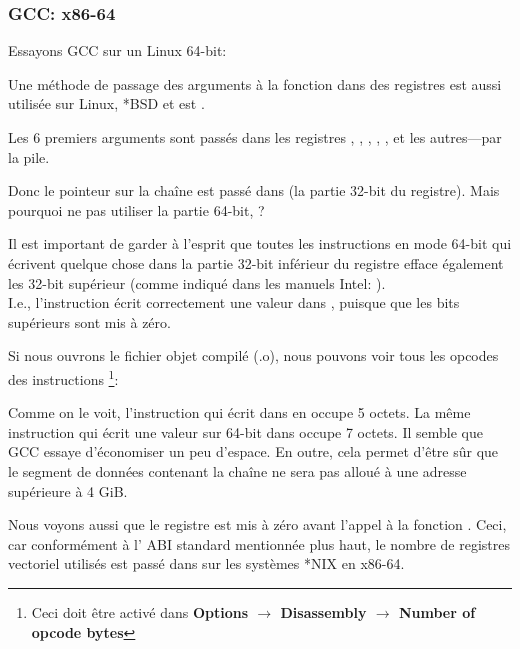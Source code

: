 \subsubsection{GCC: x86-64}

Essayons GCC sur un Linux 64-bit:



Une méthode de passage des arguments à la fonction dans des registres est aussi utilisée sur Linux, *BSD et
\MacOSX est \SysVABI.

Les 6 premiers arguments sont passés dans les registres \RDI, \RSI, \RDX, \RCX, ,  et les autres---par
la pile.

Donc le pointeur sur la chaîne est passé dans \EDI (la partie 32-bit du registre).
Mais pourquoi ne pas utiliser la partie 64-bit, \RDI?

Il est important de garder à l'esprit que toutes les instructions \MOV en mode 64-bit qui écrivent quelque chose
dans la partie 32-bit inférieur du registre efface également les 32-bit supérieur (comme indiqué dans les manuels Intel:
).\\
I.e., l'instruction  écrit correctement une valeur dans \RAX, puisque que les bits supérieurs
sont mis à zéro.

Si nous ouvrons le fichier objet compilé (.o), nous pouvons voir tous les opcodes des instructions
\footnote{Ceci doit être activé dans \textbf{Options $\rightarrow$ Disassembly $\rightarrow$ Number of opcode bytes}}:



\label{hw_EDI_instead_of_RDI}
Comme on le voit, l'instruction qui écrit dans \EDI en  occupe 5 octets.
La même instruction qui écrit une valeur sur 64-bit dans \RDI occupe 7 octets.
Il semble que GCC essaye d'économiser un peu d'espace.
En outre, cela permet d'être sûr que le segment de données contenant la chaîne ne sera pas alloué à une adresse supérieure
à 4 \gls{GiB}.

\label{SysVABI_input_EAX}
Nous voyons aussi que le registre \EAX est mis à zéro avant l'appel à la fonction \printf.
Ceci, car conformément à l' \ac{ABI} standard mentionnée plus haut,
le nombre de registres vectoriel utilisés est passé dans \EAX sur les systèmes *NIX en x86-64.

